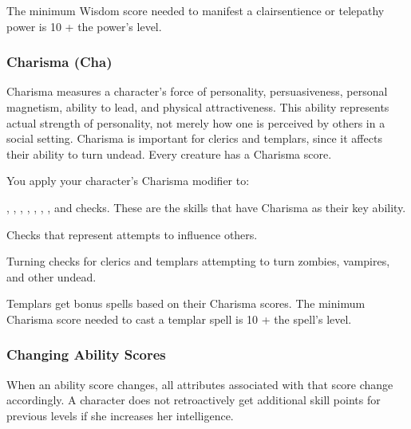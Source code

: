The minimum Wisdom score needed to manifest a clairsentience or telepathy power is 10 + the power's level.

\subsubsection{Charisma (Cha)}
Charisma measures a character's force of personality, persuasiveness, personal magnetism, ability to lead, and physical attractiveness. This ability represents actual strength of personality, not merely how one is perceived by others in a social setting. Charisma is important for clerics and templars, since it affects their ability to turn undead. Every creature has a Charisma score.

You apply your character's Charisma modifier to:
\begin{itemize*}
\item {}, , , , , , , and  checks. These are the skills that have Charisma as their key ability.
\item Checks that represent attempts to influence others.
\item Turning checks for clerics and templars attempting to turn zombies, vampires, and other undead.
\end{itemize*}

Templars get bonus spells based on their Charisma scores. The minimum Charisma score needed to cast a templar spell is 10 + the spell's level.

\subsubsection{Changing Ability Scores}
When an ability score changes, all attributes associated with that score change accordingly. A character does not retroactively get additional skill points for previous levels if she increases her intelligence.
